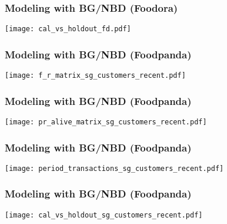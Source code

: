 \documentclass{beamer} %
\theoremstyle{definition} %
\begin{document}
\begin{frame}
\frametitle{Modeling with BG/NBD (Foodora)}
\begin{center}
            \texttt{[image: cal\_vs\_holdout\_fd.pdf]}
        \end{center}
\end{frame}

\begin{frame}
\frametitle{Modeling with BG/NBD (Foodpanda)}
\begin{center}
            \texttt{[image: f\_r\_matrix\_sg\_customers\_recent.pdf]}
        \end{center}
\end{frame}

\begin{frame}
\frametitle{Modeling with BG/NBD (Foodpanda)}
\begin{center}
            \texttt{[image: pr\_alive\_matrix\_sg\_customers\_recent.pdf]}
        \end{center}
\end{frame}

\begin{frame}
\frametitle{Modeling with BG/NBD (Foodpanda)}
\begin{center}
            \texttt{[image: period\_transactions\_sg\_customers\_recent.pdf]}
        \end{center}
\end{frame}

\begin{frame}
\frametitle{Modeling with BG/NBD (Foodpanda)}
\begin{center}
            \texttt{[image: cal\_vs\_holdout\_sg\_customers\_recent.pdf]}
        \end{center}
\end{frame}
\end{document}

